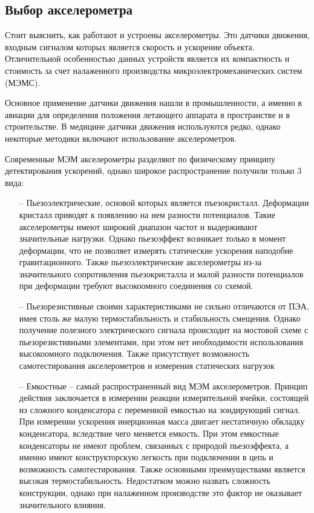 \subsection{Выбор акселерометра}


Стоит выяснить, как работают и устроены акселерометры. \cite{MEMS} Это датчики движения, входным сигналом которых является скорость и ускорение объекта. Отличительной особенностью данных устройств является их компактность и стоимость за счет налаженного производства микроэлектромеханических систем (МЭМС).

Основное применение датчики движения нашли в промышленности, а именно в авиации для определения положения летающего аппарата в пространстве и в строительстве. В медицине датчики движения используются редко, однако некоторые методики включают использование акселерометров.

Современные МЭМ акселерометры разделяют по физическому принципу детектирования ускорений, однако широкое распространение получили только 3 вида:

\begin{itemize}

	\item[--]Пьезоэлектрические, основой которых является пъезокристалл. Деформации кристалл приводят к появлению на нем разности потенциалов. Такие акселерометры имеют широкий диапазон частот и выдерживают значительные нагрузки. Однако пьезоэффект возникает только в момент деформации, что не позволяет измерять статические ускорения наподобие гравитационного. Также пьезоэлектрические акселерометры из-за значительного сопротивления пьезокристалла и малой разности потенциалов при деформации требуют высокоомного соединения со схемой. 

	\item[--]Пьезорезистивные своими характеристиками не сильно отличаются от ПЭА, имея столь же малую термостабильность и стабильность смещения. Однако получение полезного электрического сигнала происходит на мостовой схеме с пьезорезистивными элементами, при этом нет необходимости использования высокоомного подключения. Также присутствует возможность самотестирования акселерометров и измерения статических нагрузок 

	\item[--]Емкостные – самый распространенный вид МЭМ акселерометров. Принцип действия заключается в измерении реакции измерительной ячейки, состоящей из сложного конденсатора с переменной емкостью на зондирующий сигнал. При измерении ускорения инерционная масса двигает нестатичную обкладку конденсатора, вследствие чего меняется емкость. При этом емкостные конденсаторы не имеют проблем, связанных с природой пьезоэффекта, а именно имеют конструкторскую легкость при подключении в цепь и возможность самотестирования. Также основными преимуществами является высокая термостабильность. Недостатком можно назвать сложность конструкции, однако при налаженном производстве это фактор не оказывает значительного влияния.

\end{itemize}


